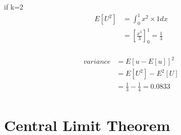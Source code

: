 \documentclass[journal,12pt,twocolumn]{IEEEtran}
\begin{document}
if k=2 
       \begin{align*}
          E[U^2] &= \int_{0} ^{1} x^{2}\times 1 dx \\
          &= \left[\frac{x^3}{3}\right]_{0} ^{1} = \frac{1}{3}
          \end{align*}\\
      \begin{align*}
    variance &= E[u-E[u]]^{2} \\
    &= E[U^{2}]-E^{2}[U] \\
    &= \frac{1}{3} - \frac{1}{4} = 0.0833 \\
     \end{align*}
    
\section{Central Limit Theorem}
\end{document}
